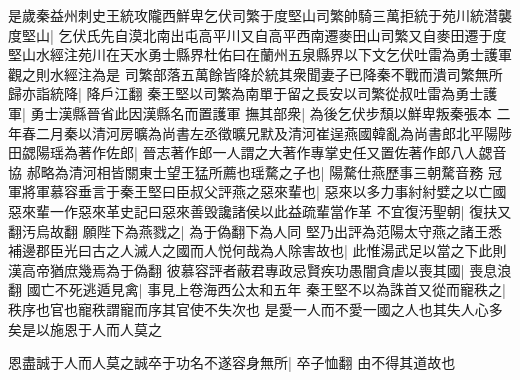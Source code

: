 是歲秦益州刺史王統攻隴西鮮卑乞伏司繁于度堅山司繁帥騎三萬拒統于苑川統潜襲度堅山|{
	乞伏氏先自漠北南出屯高平川又自高平西南遷麥田山司繁又自麥田遷于度堅山水經注苑川在天水勇士縣界杜佑曰在蘭州五泉縣界以下文乞伏吐雷為勇士護軍觀之則水經注為是}
司繁部落五萬餘皆降於統其衆聞妻子已降秦不戰而潰司繁無所歸亦詣統降|{
	降戶江翻}
秦王堅以司繁為南單于留之長安以司繁從叔吐雷為勇士護軍|{
	勇士漢縣晉省此因漢縣名而置護軍}
撫其部衆|{
	為後乞伏步頹以鮮卑叛秦張本}
二年春二月秦以清河房曠為尚書左丞徵曠兄默及清河崔逞燕國韓亂為尚書郎北平陽陟田勰陽瑶為著作佐郎|{
	晉志著作郎一人謂之大著作專掌史任又置佐著作郎八人勰音協}
郝略為清河相皆關東士望王猛所薦也瑶騖之子也|{
	陽騖仕燕歷事三朝騖音務}
冠軍將軍慕容垂言于秦王堅曰臣叔父評燕之惡來輩也|{
	惡來以多力事紂紂嬖之以亡國惡來輩一作惡來革史記曰惡來善毁讒諸侯以此益疏輩當作革}
不宜復汚聖朝|{
	復扶又翻汚烏故翻}
願陛下為燕戮之|{
	為于偽翻下為人同}
堅乃出評為范陽太守燕之諸王悉補邊郡臣光曰古之人滅人之國而人悦何哉為人除害故也|{
	此惟湯武足以當之下此則漢高帝猶庶幾焉為于偽翻}
彼慕容評者蔽君專政忌賢疾功愚闇貪虐以喪其國|{
	喪息浪翻}
國亡不死逃遁見禽|{
	事見上卷海西公太和五年}
秦王堅不以為誅首又從而寵秩之|{
	秩序也官也寵秩謂寵而序其官使不失次也}
是愛一人而不愛一國之人也其失人心多矣是以施恩于人而人莫之

恩盡誠于人而人莫之誠卒于功名不遂容身無所|{
	卒子恤翻}
由不得其道故也

